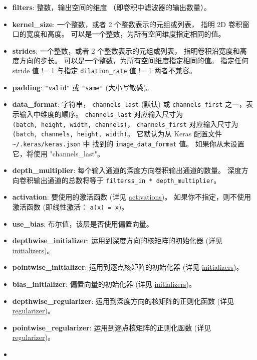 \begin{itemize}
\tightlist
\item
  \textbf{filters}: 整数，输出空间的维度 （即卷积中滤波器的输出数量）。
\item
  \textbf{kernel\_size}: 一个整数，或者 2 个整数表示的元组或列表， 指明
  2D 卷积窗口的宽度和高度。 可以是一个整数，为所有空间维度指定相同的值。
\item
  \textbf{strides}: 一个整数，或者 2 个整数表示的元组或列表，
  指明卷积沿宽度和高度方向的步长。
  可以是一个整数，为所有空间维度指定相同的值。 指定任何 stride 值 != 1
  与指定 \texttt{dilation\_rate} 值 != 1 两者不兼容。
\item
  \textbf{padding}: \texttt{"valid"} 或 \texttt{"same"} (大小写敏感)。
\item
  \textbf{data\_format}: 字符串， \texttt{channels\_last} (默认) 或
  \texttt{channels\_first} 之一，表示输入中维度的顺序。
  \texttt{channels\_last} 对应输入尺寸为
  \texttt{(batch,\ height,\ width,\ channels)}，
  \texttt{channels\_first} 对应输入尺寸为
  \texttt{(batch,\ channels,\ height,\ width)}。 它默认为从 Keras
  配置文件 \texttt{\textasciitilde{}/.keras/keras.json} 中 找到的
  \texttt{image\_data\_format} 值。 如果你从未设置它，将使用
  "channels\_last"。
\item
  \textbf{depth\_multiplier}: 每个输入通道的深度方向卷积输出通道的数量。
  深度方向卷积输出通道的总数将等于
  \texttt{filterss\_in\ *\ depth\_multiplier}。
\item
  \textbf{activation}: 要使用的激活函数 (详见
  \hyperref[activations]{activations})。
  如果你不指定，则不使用激活函数 (即线性激活： \texttt{a(x)\ =\ x})。
\item
  \textbf{use\_bias}: 布尔值，该层是否使用偏置向量。
\item
  \textbf{depthwise\_initializer}: 运用到深度方向的核矩阵的初始化器
  (详见 \hyperref[initializers]{initializers})。
\item
  \textbf{pointwise\_initializer}: 运用到逐点核矩阵的初始化器 (详见
  \hyperref[initializers]{initializers})。
\item
  \textbf{bias\_initializer}: 偏置向量的初始化器 (详见
  \hyperref[initializers]{initializers})。
\item
  \textbf{depthwise\_regularizer}: 运用到深度方向的核矩阵的正则化函数
  (详见 \hyperref[regularizers]{regularizer})。
\item
  \textbf{pointwise\_regularizer}: 运用到逐点核矩阵的正则化函数 (详见
  \hyperref[regularizers]{regularizer})。
\item

\end{itemize}

